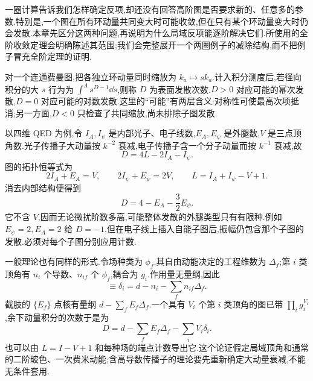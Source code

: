 \label{ch:general-renormalization}

一圈计算告诉我们怎样确定反项,却还没有回答高阶图是否要求新的、任意多的参数.特别是,一个图在所有环动量共同变大时可能收敛,但在只有某个环动量变大时仍会发散.本章先区分这两种问题,再说明为什么局域反项能逐阶解决它们.所使用的全阶收敛定理会明确陈述其范围;我们会完整展开一个两圈例子的减除结构,而不把例子冒充全阶定理的证明.


对一个连通费曼图,把各独立环动量同时缩放为 $k_a\mapsto sk_a$.计入积分测度后,若径向积分的大 $s$ 行为为 $\int^\Lambda s^{D-1}\dd s$,则称 $D$ 为表面发散次数.$D>0$ 对应可能的幂次发散,$D=0$ 对应可能的对数发散.这里的“可能”有两层含义:对称性可使最高次项抵消;另一方面,$D<0$ 只检查了共同缩放,尚未排除子图发散.

以四维 QED 为例,令 $I_A,I_\psi$ 是内部光子、电子线数,$E_A,E_\psi$ 是外腿数,$V$ 是三点顶角数.光子传播子大动量按 $k^{-2}$ 衰减,电子传播子含一个分子动量而按 $k^{-1}$ 衰减,故
\begin{equation}
 D=4L-2I_A-I_\psi.
\end{equation}
图的拓扑恒等式为
\begin{equation}
 2I_A+E_A=V,\qquad 2I_\psi+E_\psi=2V,\qquad
 L=I_A+I_\psi-V+1.
\end{equation}
消去内部结构便得到
\begin{equation}
 D=4-E_A-\frac32E_\psi.
 \label{eq:qed-superficial-degree}
\end{equation}
它不含 $V$,因而无论微扰阶数多高,可能整体发散的外腿类型只有有限种.例如 $E_\psi=2,E_A=2$ 给 $D=-1$,但在电子线上插入自能子图后,振幅仍包含那个子图的发散.必须对每个子图分别应用计数.

一般理论也有同样的形式.令场种类为 $\phi_f$,其自由动能决定的工程维数为 $\Delta_f$;第 $i$ 类顶角有 $n_i$ 个导数、$n_{if}$ 个 $\phi_f$,耦合为 $g_i$.作用量无量纲,因此
\begin{equation}
 [g_i]\equiv\delta_i=d-n_i-\sum_f n_{if}\Delta_f.
\end{equation}
截肢的 $\{E_f\}$ 点核有量纲 $d-\sum_fE_f\Delta_f$.一个具有 $V_i$ 个第 $i$ 类顶角的图已带 $\prod_i g_i^{V_i}$,余下动量积分的次数于是为
\begin{equation}
 D=d-\sum_fE_f\Delta_f-\sum_iV_i\delta_i.
 \label{eq:general-superficial-degree}
\end{equation}
也可以由 $L=I-V+1$ 和每种场的端点计数导出它.这个论证假定局域顶角和通常的二阶玻色、一次费米动能;含高导数传播子的理论要先重新确定大动量衰减,不能无条件套用.

